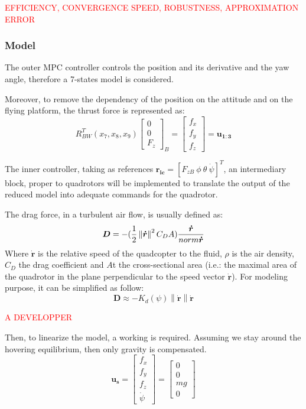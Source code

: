 \documentclass[a4paper, 12pt]{report}
\newcommand\norm[1]{\left\lVert#1\right\rVert}
\begin{document}
\textcolor{red}{EFFICIENCY, CONVERGENCE SPEED, ROBUSTNESS, APPROXIMATION ERROR}


\subsubsection{Model}
The outer MPC controller controls the position and its derivative and the yaw angle, therefore a 7-states model is considered. 

Moreover, to remove the dependency of the position on the attitude and on the flying platform, the thrust force is represented as:
\[ R_{BW}^T(x_7, x_8, x_9) \begin{bmatrix}  0\\ 0\\ F_z \end{bmatrix}_B = \begin{bmatrix}  f_x\\ f_y\\ f_z \end{bmatrix} = \boldsymbol{u_{1:3}}\]

The inner controller, taking as references $\boldsymbol{r_{ic}} = [F_{zB} \ \phi \  \theta \ \dot \psi]^T$, an intermediary block, proper to quadrotors will be implemented to translate the output of the reduced model into adequate commands for the quadrotor.

The drag force, in a turbulent air flow, is usually defined as:
\[ \boldsymbol{D} = -(\frac{1}{2} \norm{\boldsymbol{\dot r}}^2 C_D A) \frac{\boldsymbol{\dot r}}{\\norm{\boldsymbol{\dot r}}}\]
Where $\boldsymbol{\dot r}$ is the relative speed of the quadcopter to the fluid, $\rho$ is the air density, $C_D$  the drag coefficient and $A$t the cross-sectional area (i.e.: the maximal area of the quadrotor in the plane perpendicular to the speed vector $\boldsymbol{\dot r}$). For modeling purpose, it can be simplified as follow:
\[ \boldsymbol{D} \approx -K_d(\psi) \norm{\boldsymbol{\dot r}} \boldsymbol{\dot r}\]

\textcolor{red}{A DEVELOPPER}

Then, to linearize the model, a working is required. Assuming we stay around the hovering equilibrium, then only gravity is compensated.
\[ \boldsymbol{u_s} = \begin{bmatrix} f_x \\ f_y \\ f_z \\ \dot \psi \end{bmatrix} = \begin{bmatrix}  0\\ 0\\ mg \\ 0\end{bmatrix} \]
\end{document}
